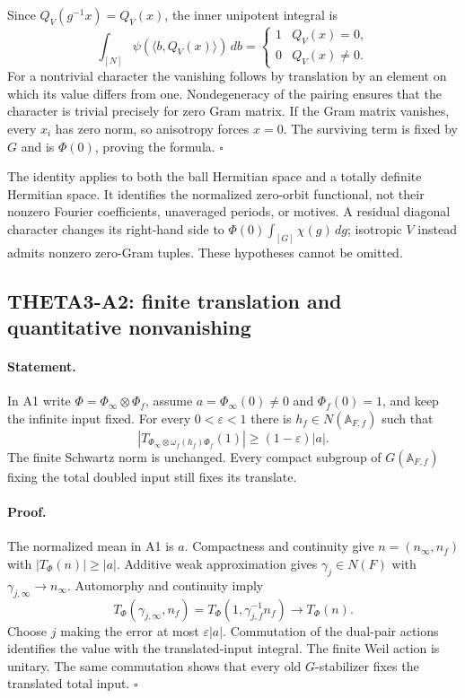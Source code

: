 \documentclass[11pt]{article}
\newcommand{\A}{\mathbb A}
\begin{document}
Since $Q_V(g^{-1}x)=Q_V(x)$, the inner unipotent integral is
\[
 \int_{[N]}\psi(\langle b,Q_V(x)\rangle)\,db
 =\begin{cases}1&Q_V(x)=0,\\0&Q_V(x)\ne0.\end{cases}
\]
For a nontrivial character the vanishing follows by translation by an
element on which its value differs from one. Nondegeneracy of the
pairing ensures that the character is trivial precisely for zero Gram
matrix. If the Gram matrix vanishes, every $x_i$ has zero norm, so
anisotropy forces $x=0$. The surviving term is fixed by $G$ and is
$\Phi(0)$, proving the formula. $\square$

The identity applies to both the ball Hermitian space and a totally
definite Hermitian space. It identifies the normalized zero-orbit
functional, not their nonzero Fourier coefficients, unaveraged periods,
or motives. A residual diagonal character changes its right-hand side
to $\Phi(0)\int_{[G]}\chi(g)\,dg$; isotropic $V$ instead admits
nonzero zero-Gram tuples. These hypotheses cannot be omitted.

\subsection{THETA3-A2: finite translation and quantitative nonvanishing}\label{A2}

\paragraph{Statement.}
In A1 write $\Phi=\Phi_\infty\otimes\Phi_f$, assume
$a=\Phi_\infty(0)\ne0$ and $\Phi_f(0)=1$, and keep the infinite input
fixed. For every $0<\varepsilon<1$ there is $h_f\in N(\A_{F,f})$
such that
\[
 \left|T_{\Phi_\infty\otimes\omega_f(h_f)\Phi_f}(1)\right|
                   \geq(1-\varepsilon)|a|.
\]
The finite Schwartz norm is unchanged. Every compact subgroup of
$G(\A_{F,f})$ fixing the total doubled input still fixes its translate.

\paragraph{Proof.}
The normalized mean in A1 is $a$. Compactness and continuity give
$n=(n_\infty,n_f)$ with $|T_\Phi(n)|\geq|a|$. Additive weak
approximation gives $\gamma_j\in N(F)$ with
$\gamma_{j,\infty}\longrightarrow n_\infty$. Automorphy and
continuity imply
\[
 T_\Phi(\gamma_{j,\infty},n_f)
 =T_\Phi(1,\gamma_{j,f}^{-1}n_f)
 \longrightarrow T_\Phi(n).
\]
Choose $j$ making the error at most $\varepsilon|a|$. Commutation of
the dual-pair actions identifies the value with the translated-input
integral. The finite Weil action is unitary. The same commutation shows
that every old $G$-stabilizer fixes the translated total input.
$\square$
\end{document}
